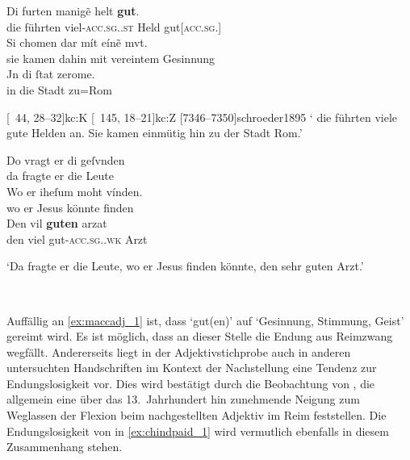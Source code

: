 \begin{exe}
\ex \label{ex:maccadj}
	\begin{xlist}
	\ex \label{ex:maccadj_1}
		\gll Di furten manigẽ helt \textbf{gut}. \\
			die führten viel-\textsc{acc.sg.\MascM.st} Held
			gut[\textsc{acc.sg.\MascM}] \\
	\sn \gll Si chomen dar mít eínẽ mvt. \\
			sie kamen dahin mit vereintem Gesinnung \\
	\sn \gll Jn di ſtat zerome. \\
			in die Stadt zu=Rom \\
		\begin{taggedline}{\parencites%
			[\pno~55\vb, 20--24]{kc:M}[vgl.]%
			[\pno~31\vb, 27--31]{kc:A1}
			[\pno~43\vb,15--19]{kc:H}
			[\pno~38\va, 18--21]{kc:C1}
			[\pno~44\rb, 28--32]{kc:K}
			[\pno~145\ra, 18--21]{kc:Z}
			[7346--7350]{schroeder1895}
		}
		\trans `\textelp{} die führten viele gute Helden an. Sie kamen einmütig 	hin zu der Stadt Rom.'
		\end{taggedline}

	\ex \label{ex:maccadj_2}
		\gll Do vragt er di geſvnden \\
			da fragte er die Leute \\
	\sn \gll Wo er iheſum moht vínden. \\
			wo er Jesus könnte finden \\
	\sn \gll Den vil \textbf{guten} arzat \\
			den viel gut-\textsc{acc.sg.\MascM.wk} Arzt \\
		\begin{taggedline}{\parencites%
			[\pno~6\rb, 31]{kc:M}[vgl.]%
			[\pno~3\vb, 26--28]{kc:A1}
			[\pno~4\rb, 28--30]{kc:H}
			[\pno~4\rb, 35--36]{kc:B1}
			[\pno~7\ra, 9--10]{kc:P}
			[\pno~4\ra, 24--27]{kc:C1}
			[\pno~12\va, 12--15]{kc:Z}
			[723--725]{schroeder1895}
		}
		\trans `Da fragte er die Leute, wo er Jesus finden
			könnte, den sehr guten Arzt.'%
		\end{taggedline}
		\\
	\end{xlist}
\end{exe}

Auffällig an \cref{ex:maccadj_1} ist, dass  `gut(en)' auf
 `Gesinnung, Stimmung, Geist' gereimt wird. Es ist möglich,
dass an dieser Stelle die Endung aus Reimzwang wegfällt. Andererseits liegt in
der Adjektivstichprobe auch in anderen untersuchten Handschriften im Kontext
der Nachstellung eine Tendenz zur Endungslosigkeit vor. Dies wird bestätigt
durch die Beobachtung von \citet[241]{ksw2}, die allgemein eine über das
13.~Jahrhundert hin zunehmende Neigung zum Weglassen der Flexion beim
nachgestellten Adjektiv im Reim feststellen. Die Endungslosigkeit von
 in \cref{ex:chindpaid_1} wird vermutlich ebenfalls in diesem
Zusammenhang stehen.

